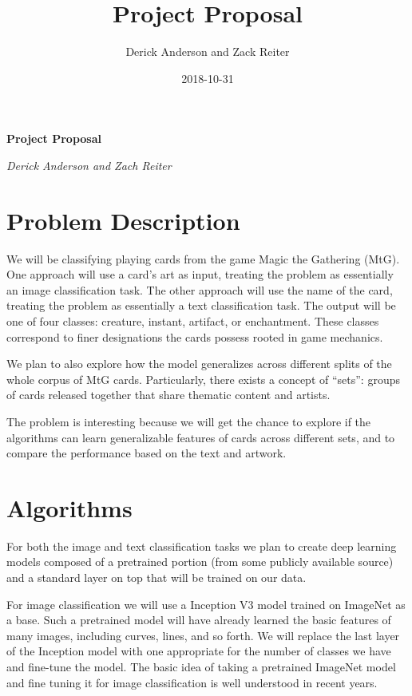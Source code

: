 \documentclass{article}
\title{Project Proposal}
\date{2018-10-31}
\author{Derick Anderson and Zack Reiter}
\begin{document}

\begin{center}
  \textbf{Project Proposal}
  
  \textit{Derick Anderson and Zach Reiter}
\end{center}

\section*{Problem Description}

We will be classifying playing cards from the game Magic the Gathering (MtG).
One approach will use a card's art as input,
treating the problem
as essentially an image classification task.
The other approach will use the name of the card,
treating the problem
as essentially a text classification task.
The output will be one of four classes:
creature, instant, artifact, or enchantment.
These classes correspond to
finer designations the cards possess
rooted in game mechanics.

We plan to also explore
how the model generalizes across different splits
of the whole corpus of MtG cards.
Particularly,
there exists a concept of ``sets'':
groups of cards released together that share thematic content and artists.

The problem is interesting because we will get the chance to
explore if the algorithms can learn generalizable features
of cards across different sets,
and to compare the performance based on the text and artwork.

\section*{Algorithms}

For both the image and text classification tasks
we plan to create deep learning models
composed of a pretrained portion
(from some publicly available source)
and a standard layer on top that will be trained on our data.

For image classification
we will use a Inception V3
\cite{rethinking-the-inception-architecture}
model trained on ImageNet as a base.
Such a pretrained model
will have already learned the basic features of many images,
including curves, lines, and so forth.
We will replace the last layer of the Inception model
with one appropriate for the number of classes we have
and fine-tune the model.
The basic idea of taking a pretrained ImageNet model
and fine tuning it for image classification is well understood
in recent years.
\end{document}
